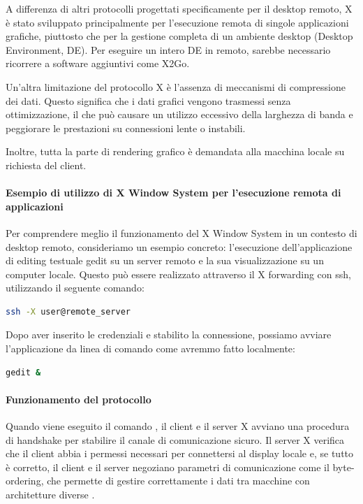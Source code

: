 \documentclass[12pt,a4paper,openright,twoside]{book}
\begin{document}
A differenza di altri protocolli progettati specificamente per il desktop remoto, X è stato sviluppato principalmente per l'esecuzione remota di singole applicazioni grafiche, piuttosto che per la gestione completa di un ambiente desktop (Desktop Environment, DE). Per eseguire un intero DE in remoto, sarebbe necessario ricorrere a software aggiuntivi come X2Go.

Un'altra limitazione del protocollo X è l'assenza di meccanismi di compressione dei dati. Questo significa che i dati grafici vengono trasmessi senza ottimizzazione, il che può causare un utilizzo eccessivo della larghezza di banda e peggiorare le prestazioni su connessioni lente o instabili.

Inoltre, tutta la parte di rendering grafico è demandata alla macchina locale su richiesta del client.

\paragraph{Esempio di utilizzo di X Window System per l'esecuzione remota di applicazioni}

Per comprendere meglio il funzionamento del X Window System in un contesto di desktop remoto, consideriamo un esempio concreto: l'esecuzione dell'applicazione di editing testuale gedit su un server remoto e la sua visualizzazione su un computer locale. Questo può essere realizzato attraverso il X forwarding con ssh, utilizzando il seguente comando:

\begin{lstlisting}[caption={Connessione remota con X forwarding}, label={lst:ssh-x}, language=bash]
ssh -X user@remote_server
\end{lstlisting}

Dopo aver inserito le credenziali e stabilito la connessione, possiamo avviare l'applicazione da linea di comando come avremmo fatto localmente:

\begin{lstlisting}[caption={Esecuzione di gedit su server remoto}, label={lst:gedit}, language=bash]
gedit &
\end{lstlisting}

\paragraph{Funzionamento del protocollo}

Quando viene eseguito il comando , il client e il server X avviano una procedura di handshake per stabilire il canale di comunicazione sicuro. Il server X verifica che il client abbia i permessi necessari per connettersi al display locale e, se tutto è corretto, il client e il server negoziano parametri di comunicazione come il byte-ordering, che permette di gestire correttamente i dati tra macchine con architetture diverse \cite{coopersmith2024x}.
\end{document}
